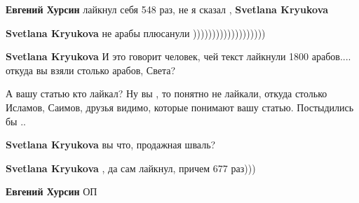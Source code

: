 \begin{itemize}
\begin{itemize}
\textbf{Евгений Хурсин} лайкнул себя 548 раз, не я сказал , \textbf{Svetlana Kryukova}

 
\textbf{Svetlana Kryukova} не арабы плюсанули )))))))))))))))))))

 
\textbf{Svetlana Kryukova}
И это говорит человек, чей текст лайкнули 1800 арабов.... откуда вы взяли столько арабов, Света?

 
А вашу статью кто лайкал? Ну вы , то понятно не лайкали, откуда столько Исламов, Саимов, друзья видимо, которые понимают вашу статью. Постыдились бы ..

 
\textbf{Svetlana Kryukova} вы что, продажная шваль?

 
\textbf{Svetlana Kryukova} , да сам лайкнул, причем 677 раз)))

 
\textbf{Евгений Хурсин} ОП \Smiley[1.0][yellow]

 

\end{itemize}
\end{itemize}
